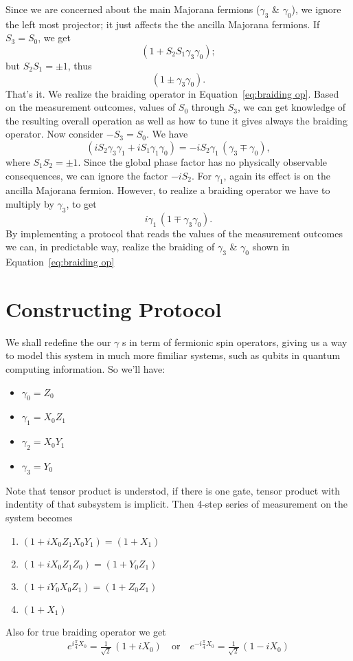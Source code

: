 \documentclass{article}
\begin{document}
Since we are concerned about the main Majorana fermions ($ \gamma_3 $ \& $ \gamma_0 $), we ignore the left most projector; it just affects the the ancilla Majorana fermions.
If $ S_3 = S_0 $, we get
\[
	( 1 + S_2 S_1 \gamma_3 \gamma_0 );
\]
but $ S_2 S_1 = \pm 1 $, thus
\[
	( 1 \pm \gamma_3 \gamma_0 ).
\]
That's it. We realize the braiding operator in Equation~\ref{eq:braiding op}. Based on the measurement outcomes, values of $ S_0 $ through $ S_3 $, we can get knowledge of the resulting overall operation as well as how to tune it gives always the braiding operator. Now consider $ -S_3 = S_0 $. We have
\[
	( iS_2 \gamma_3 \gamma_1 +iS_1 \gamma_1 \gamma_0)
	= 	-i S_2 \gamma_1\, ( \gamma_3 \mp \gamma_0) ,
\]
where $ S_1 S_2 = \pm 1 $. Since the global phase factor has no physically observable consequences, we can ignore the factor $ -iS_2 $. For $ \gamma_1 $, again its effect is on the ancilla Majorana fermion. However, to realize a braiding operator we have to multiply by $ \gamma_3 $, to get
\[
	i \gamma_1\, (1 \mp \gamma_3 \gamma_0).
\]
By implementing a protocol that reads the values of the measurement outcomes we can, in predictable way, realize the braiding of $ \gamma_3 $ \& $ \gamma_0 $ shown in Equation~\ref{eq:braiding op}

\section{Constructing Protocol} %
\label{sec:Constructing Protocol}
We shall redefine the our $ \gamma $ s in term of fermionic spin operators, giving us a way to model
this system in much more fimiliar systems, such as qubits in quantum computing information. So we'll have:
\begin{itemize}
	\item $ \gamma_0 = Z_0 $
	\item $ \gamma_1 = X_0 Z_1 $
	\item $ \gamma_2 = X_0 Y_1 $
	\item $ \gamma_3 = Y_0 $
\end{itemize}
Note that tensor product is understod, if there is one gate, tensor product with indentity of that subsystem is implicit.
Then 4-step series of measurement on the system becomes
\begin{enumerate}
	\item $ (1 + i X_0 Z_1 X_0 Y_1) = (1 + X_1) $
	\item $ (1 + i X_0 Z_1 Z_0) = (1 + Y_0 Z_1) $
	\item $ (1 + i Y_0 X_0 Z_1) = (1 + Z_0 Z_1) $
	\item $ (1 + X_1) $
\end{enumerate}
Also for true braiding operator we get
$$
	\begin{aligned}
		e^{i \frac{\pi}{4} X_0} = \frac{1}{\sqrt{2}}\, (1 + i X_0 ) \quad \text{or} \quad
		e^{-i \frac{\pi}{4} X_0} = \frac{1}{\sqrt{2}}\, (1 - i X_0 )
		\label{eq:br Jordan-Wigner}
	\end{aligned}
$$
\end{document}
